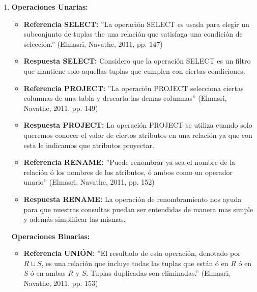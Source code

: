 \documentclass[twoside]{article}
\begin{document}
\begin{enumerate}
\begin{itemize}
                        Y en el mismo nivel de importancia se encuentra la restriccion de integridad referencial ya que con esta se establece que ambas tuplas relacionadas deben existir en las dos entidades.
                        Finalmente, el aplicar estas dos restricciones es muy importante ya que garantizan que las conexiones entre entidades se mantengan su integridad.
            \end{itemize}
      \item
            \textbf{Operaciones Unarias:}
            \begin{itemize}
                  \item \textbf{Referencia SELECT:} ''La operaci\'on SELECT es usada para elegir un subconjunto de tuplas the una relaci\'on que satisfaga una condici\'on de selecci\'on.''
                        (Elmasri, Navathe, 2011, pp. 147)
                  \item \textbf{Respuesta SELECT:} Considero que la operaci\'on SELECT es un filtro que mantiene solo aquellas tuplas que cumplen con ciertas condiciones.
                  \item \textbf{Referencia PROJECT:} ''La operaci\'on PROJECT selecciona ciertas columnas de una tabla y descarta las demas columnas'' (Elmasri, Navathe, 2011, pp. 149)
                  \item \textbf{Respuesta PROJECT:} La operaci\'on PROJECT se utiliza cuando solo queremos conocer el valor de ciertos atributos en una relaci\'on ya que con esta le indicamos que atributos proyectar.
                  \item \textbf{Referencia RENAME:} ''Puede renombrar ya sea el nombre de la relaci\'on \'o los nombres de los atributos, \'o ambos como un operador unario''
                        (Elmasri, Navathe, 2011, pp. 152)
                  \item \textbf{Respuesta RENAME:} La operaci\'on de renombramiento nos ayuda para que nuestras consultas puedan ser entendidas de manera mas simple y adem\'as simplificar las mismas.
            \end{itemize}
            \textbf{Operaciones Binarias:}
            \begin{itemize}
                  \item \textbf{Referencia UNI\'ON:} ''El resultado de esta operaci\'on, denotado por $R \cup S$, es una relaci\'on que incluye todas las tuplas que est\'an
                        \'o en $R$ \'o en $S$ \'o en ambas $R$ y $S$. Tuplas duplicadas son eliminadas.'' (Elmasri, Navathe, 2011, pp. 153)

\end{itemize}
\end{enumerate}
\end{document}

